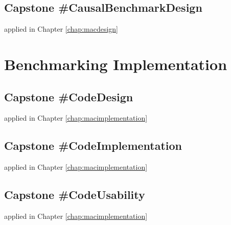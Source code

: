 \documentclass[../main.tex]{subfiles}
\begin{document}

\subsection*{\textbf{Capstone \#CausalBenchmarkDesign}}
\label{lo:CausalBenchmarkDesign}

applied in Chapter \ref{chap:macdesign}


\section{Benchmarking Implementation}

\subsection*{\textbf{Capstone \#CodeDesign}}
\label{lo:CodeDesign}

applied in Chapter \ref{chap:macimplementation}


\subsection*{\textbf{Capstone \#CodeImplementation}}
\label{lo:CodeImplementation}

applied in Chapter \ref{chap:macimplementation}


\subsection*{\textbf{Capstone \#CodeUsability}}
\label{lo:CodeUsability}

applied in Chapter \ref{chap:macimplementation}

\end{document}
